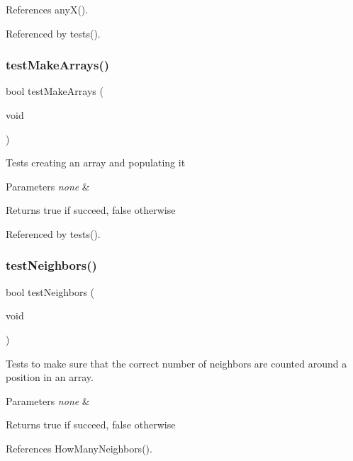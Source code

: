 References any\+X().



Referenced by tests().

\mbox{\label{tests_8c_af6e338851f3ccb4714e1bfb06ec4b428}} 
\subsubsection{test\+Make\+Arrays()}
{\footnotesize\ttfamily bool test\+Make\+Arrays (\begin{DoxyParamCaption}\item[{void}]{ }\end{DoxyParamCaption})}

Tests creating an array and populating it 
\begin{DoxyParams}{Parameters}
{\em none} & \\
\hline
\end{DoxyParams}
\begin{DoxyReturn}{Returns}
true if succeed, false otherwise 
\end{DoxyReturn}


Referenced by tests().

\mbox{\label{tests_8c_a3809ae80cb3300c9a6d248b7db6a1a99}} 
\subsubsection{test\+Neighbors()}
{\footnotesize\ttfamily bool test\+Neighbors (\begin{DoxyParamCaption}\item[{void}]{ }\end{DoxyParamCaption})}

Tests to make sure that the correct number of neighbors are counted around a position in an array. 
\begin{DoxyParams}{Parameters}
{\em none} & \\
\hline
\end{DoxyParams}
\begin{DoxyReturn}{Returns}
true if succeed, false otherwise 
\end{DoxyReturn}


References How\+Many\+Neighbors().



